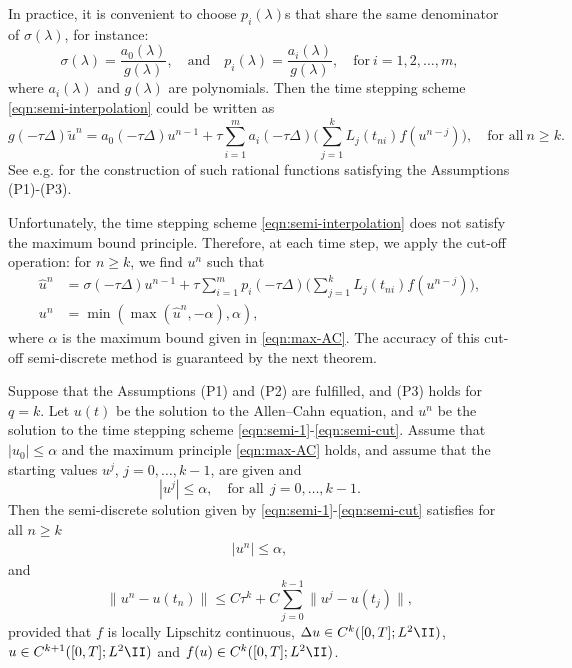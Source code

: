 \begin{remark}
In practice,
it is convenient to choose $p_i(\lambda)$s that share the same denominator of $\sigma(\lambda)$, for instance:
$$\sigma(\lambda) = \frac{a_0(\lambda)}{g(\lambda)},\quad \text{and} \quad p_i(\lambda) = \frac{a_i(\lambda)}{g(\lambda)},\quad \text{for}~i=1,2,\ldots,m,$$
where $a_i(\lambda)$ and $g(\lambda)$ are polynomials.
Then the time stepping scheme \eqref{eqn:semi-interpolation} could be written as
\begin{equation*}
g(-\tau\Delta)\tilde u^{n} = a_0(-\tau\Delta) u^{n-1} + \tau \sum_{i=1}^m a_i(-\tau \Delta)
\Big(\sum_{j=1}^{k} L_j (t_{ni}) f(u^{n-j})\Big),\quad \text{for all}~n\ge k.
\end{equation*}
See e.g. \cite[pp. 131]{Thomee:2006} for the construction of such rational functions satisfying the Assumptions (P1)-(P3).
\end{remark}


Unfortunately, the time stepping scheme \eqref{eqn:semi-interpolation} does not satisfy the maximum bound principle. Therefore,
at each time step, we apply the cut-off operation: for $n\ge k$, we find $u^n$ such that
\begin{align}
\hat u^{n} &= \sigma(-\tau\Delta) u^{n-1} + \tau \sum_{i=1}^m p_i(-\tau \Delta)
\Big(\sum_{j=1}^{k} L_j (t_{ni}) f(u^{n-j})\Big),\label{eqn:semi-1}\\
u^{n} &=  \min(\max(\hat u^{n},-\alpha),\alpha),\label{eqn:semi-cut}
\end{align}
where $\alpha$ is the maximum bound given in \eqref{eqn:max-AC}.
The accuracy of this cut-off semi-discrete method is guaranteed by the next theorem.


\begin{theorem}\label{thm:semi}
Suppose that the Assumptions (P1) and (P2) are fulfilled, and (P3) holds for $q=k$.
Let $u(t)$ be the solution to the Allen--Cahn equation, and $u^n$ be the solution to the time stepping scheme
\eqref{eqn:semi-1}-\eqref{eqn:semi-cut}.
Assume that $|u_0|\le \alpha$ and the maximum principle \eqref{eqn:max-AC} holds,
and assume that the starting values $u^j$, $j=0,\dots,k-1$, are given and
$$
|u^j|\le \alpha, \quad \text{for all}~~j=0,\dots,k-1.
$$
Then the semi-discrete solution given by  \eqref{eqn:semi-1}-\eqref{eqn:semi-cut} satisfies for all $n\ge k$
\begin{align*}%
|u^n|\le \alpha,
\end{align*}
and
\begin{equation*}%
\|u^n - u(t_n)\|\leq C\tau^k + C\sum_{j=0}^{k-1}\|u^j - u(t_j)\|,
\end{equation*}
provided that  $f$ is locally Lipschitz continuous, $\Delta u\in C^{k}([0,T]; L^2\II)$, $ u\in C^{k+1}([0,T];L^2\II)$ and $f(u) \in C^k([0,T];L^2\II)$.
\end{theorem}

